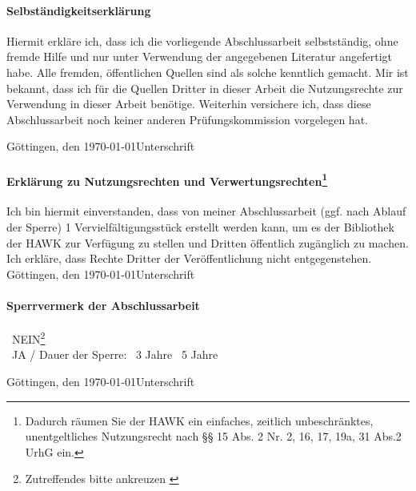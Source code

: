 

\paragraph*{Selbständigkeitserklärung}

Hiermit erkläre ich, dass ich die vorliegende Abschlussarbeit selbstständig, ohne fremde Hilfe und nur unter Verwendung der angegebenen Literatur angefertigt habe. Alle fremden, öffentlichen Quellen sind als solche kenntlich gemacht. Mir ist bekannt, dass ich für die Quellen Dritter in dieser Arbeit die Nutzungsrechte zur Verwendung in dieser Arbeit benötige. Weiterhin versichere ich, dass diese Abschlussarbeit noch keiner anderen Prüfungskommission vorgelegen hat.

Göttingen, den \today \hfill Unterschrift


\paragraph*{Erklärung zu Nutzungsrechten und Verwertungsrechten\footnote{Dadurch räumen Sie der HAWK ein einfaches, zeitlich unbeschränktes, unentgeltliches Nutzungsrecht nach §§ 15 Abs. 2 Nr. 2, 16, 17, 19a, 31 Abs.2 UrhG ein.}}

Ich bin hiermit einverstanden, dass von meiner Abschlussarbeit (ggf. nach Ablauf der Sperre) 1 Vervielfältigungsstück erstellt werden kann, um es der Bibliothek der HAWK zur Verfügung zu stellen und Dritten öffentlich zugänglich zu machen. Ich erkläre, dass Rechte Dritter der Veröffentlichung nicht entgegenstehen.\\

Göttingen, den \today \hfill Unterschrift

\paragraph*{Sperrvermerk der Abschlussarbeit}

\indent
\hspace{15mm}\Square~NEIN\footnote{Zutreffendes bitte ankreuzen \label{ftn:Zutreffendes}}  \\ 
\indent
\hspace{15mm}\Square~JA / Dauer der Sperre: \Square~3 Jahre \Square~5 Jahre

Göttingen, den \today \hfill Unterschrift